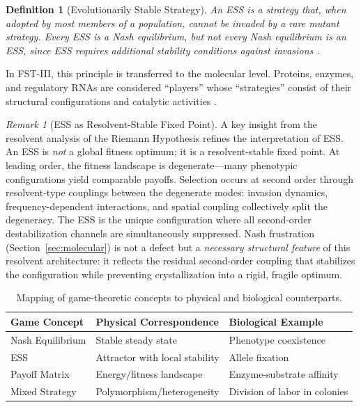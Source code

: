 \documentclass[12pt,a4paper]{article}
\newtheorem{definition}{Definition}
\theoremstyle{remark}
\newtheorem{remark}{Remark}
\begin{document}
\begin{definition}[Evolutionarily Stable Strategy]
An ESS is a strategy that, when adopted by most members of a population, cannot be invaded by a rare mutant strategy. Every ESS is a Nash equilibrium, but not every Nash equilibrium is an ESS, since ESS requires additional stability conditions against invasions \citep{MaynardSmith1982}.
\end{definition}

In FST-III, this principle is transferred to the molecular level. Proteins, enzymes, and regulatory RNAs are considered ``players'' whose ``strategies'' consist of their structural configurations and catalytic activities \citep{GameBiochemistry}.

\begin{remark}[ESS as Resolvent-Stable Fixed Point]
\label{rem:ess-resolvent}
A key insight from the resolvent analysis of the Riemann Hypothesis \citep{FST-RH2} refines the interpretation of ESS. An ESS is \emph{not} a global fitness optimum; it is a resolvent-stable fixed point. At leading order, the fitness landscape is degenerate---many phenotypic configurations yield comparable payoffs. Selection occurs at second order through resolvent-type couplings between the degenerate modes: invasion dynamics, frequency-dependent interactions, and spatial coupling collectively split the degeneracy. The ESS is the unique configuration where all second-order destabilization channels are simultaneously suppressed. Nash frustration (Section~\ref{sec:molecular}) is not a defect but a \emph{necessary structural feature} of this resolvent architecture: it reflects the residual second-order coupling that stabilizes the configuration while preventing crystallization into a rigid, fragile optimum.
\end{remark}

\begin{table}[ht]
\centering
\caption{Mapping of game-theoretic concepts to physical and biological counterparts.}
\label{tab:game-biology-mapping}
\begin{tabular}{lll}
\toprule
\textbf{Game Concept} & \textbf{Physical Correspondence} & \textbf{Biological Example} \\
\midrule
Nash Equilibrium & Stable steady state & Phenotype coexistence \\
ESS & Attractor with local stability & Allele fixation \\
Payoff Matrix & Energy/fitness landscape & Enzyme-substrate affinity \\
Mixed Strategy & Polymorphism/heterogeneity & Division of labor in colonies \\
\bottomrule
\end{tabular}
\end{table}
\end{document}
